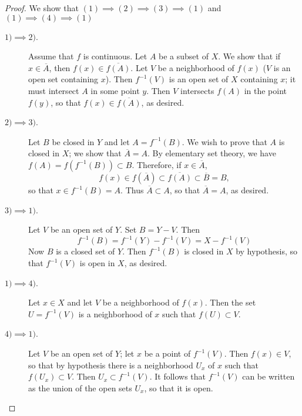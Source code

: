 \begin{proof}
We show that $(1) \implies (2) \implies (3) \implies (1)$ and $(1) \implies (4) \implies (1)$
\begin{description}
\item[$1) \implies 2)$.] Assume that $f$ is continuous. Let $A$ be a subset of $X$. We show that if $x \in \overline{A}$, then $f(x) \in \overline{f(A)}$. Let $V$ be a neighborhood of $f(x)$ ($V$ is an open set containing $x$). Then $f^{-1}(V)$ is an open set of $X$ containing $x$; it must intersect $A$ in some point $y$. Then $V$ intersects $f(A)$ in the point $f(y)$, so that $f(x) \in \overline{f(A)}$, as desired.
\item[$2) \implies 3)$.] Let $B$ be closed in $Y$ and let $A = f^{-1}(B)$. We wish to prove that $A$ is closed in $X$; we show that $\overline{A} = A$. By elementary set theory, we have $f(A) = f(f^{-1}(B)) \subset B$. Therefore, if $x \in \overline{A}$,
    $$f(x) \in f(\overline{A}) \subset \overline{f(A)} \subset \overline{B} = B,$$
so that $x \in f^{-1}(B) = A$. Thus $\overline{A} \subset A$, so that $\overline{A} = A$, as desired.
\item[$3) \implies 1)$.] Let $V$ be an open set of $Y$. Set $B = Y - V$. Then 
    $$f^{-1}(B) = f^{-1}(Y) - f^{-1}(V) = X - f^{-1}(V)$$
    Now $B$ is a closed set of $Y$. Then $f^{-1}(B)$ is closed in $X$ by hypothesis, so that $f^{-1}(V)$ is open in $X$, as desired.
\item[$1) \implies 4)$.] Let $x \in X$ and let $V$ be a neighborhood of $f(x)$. Then the set $U = f^{-1}(V)$ is a neighborhood of $x$ such that $f(U) \subset V$.
\item[$4) \implies 1)$.] Let $V$ be an open set of $Y$; let $x$ be a point of $f^{-1}(V)$. Then $f(x) \in V$, so that by hypothesis there is a neighborhood $U_x$ of $x$ such that $f\left(U_x\right)\subset V$. Then $U_x \subset f^{-1}(V)$. It follows that $f^{-1}(V)$ can be written as the union of the open sets $U_x$, so that it is open.
\end{description}
\end{proof}

